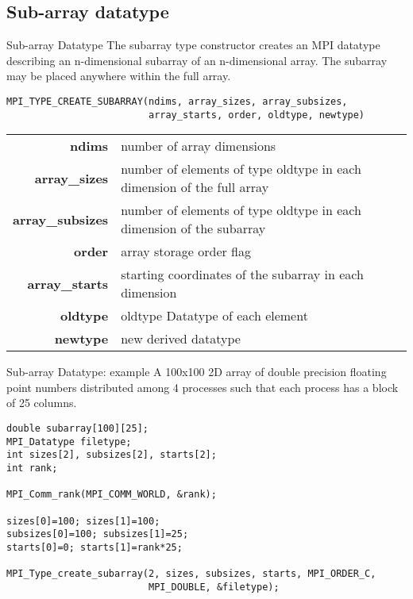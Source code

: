 \documentclass[aspectratio=43]{beamer}
\begin{document}
\subsection{Sub-array datatype}
\begin{frame}[fragile]{Sub-array Datatype}
\justifying
The subarray type constructor creates an MPI datatype describing an n-dimensional subarray of an n-dimensional array. The subarray may be placed anywhere within the full array.
\footnotesize
\begin{verbatim}
MPI_TYPE_CREATE_SUBARRAY(ndims, array_sizes, array_subsizes,
                         array_starts, order, oldtype, newtype)
\end{verbatim}
\vspace{-0.2cm}
\begin{black1block}{}
\begin{tabular}{rp{6.5cm}}
\textbf{ndims} & number of array dimensions\\
\textbf{array\_sizes} & number of elements of type oldtype in each dimension of the full array\\
\textbf{array\_subsizes} & number of elements of type oldtype in each dimension of the subarray\\
\textbf{order} & array storage order flag\\
\textbf{array\_starts} & starting coordinates of the subarray in each dimension\\
\textbf{oldtype} & oldtype Datatype of each element\\
\textbf{newtype} & new derived datatype\\
\end{tabular}
\end{black1block}
\end{frame}

\begin{frame}[fragile]{Sub-array Datatype: example}
A 100x100 2D array of double precision floating point numbers distributed among 4 processes such that each process has a block of 25 columns.

\footnotesize
\begin{verbatim}
double subarray[100][25];
MPI_Datatype filetype;
int sizes[2], subsizes[2], starts[2];
int rank;

MPI_Comm_rank(MPI_COMM_WORLD, &rank);

sizes[0]=100; sizes[1]=100;
subsizes[0]=100; subsizes[1]=25;
starts[0]=0; starts[1]=rank*25;

MPI_Type_create_subarray(2, sizes, subsizes, starts, MPI_ORDER_C,
                         MPI_DOUBLE, &filetype);
\end{verbatim}

\end{frame}
\end{document}
